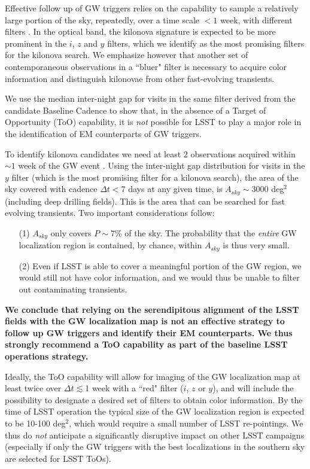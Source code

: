 Effective follow up of GW triggers relies on the capability to sample a
relatively large portion of the sky, repeatedly, over a time scale $<1$
week, with different filters \citep{Cowperthwaite15}. In the optical
band, the kilonova signature is expected to be more prominent in the
$i$, $z$  and $y$ filters, which we identify as the most promising
filters for the kilonova search. We emphasize however that another set
of contemporaneous observations in  a ``bluer" filter is necessary to
acquire color information and distinguish kilonovae from other
fast-evolving transients.

We use the median inter-night gap  for visits in the same filter derived
from the candidate Baseline Cadence  to show that,
in the absence of a Target of Opportunity (ToO) capability, it is
\emph{not} possible for LSST  to play a major role in the identification
of EM counterparts of GW triggers.

To identify kilonova candidates we need at least 2 observations acquired
within $\sim 1$ week  of the GW event \citep{Cowperthwaite15}. Using the
inter-night gap distribution for visits in the $y$ filter (which is the
most promising filter for a kilonova search), the area of the sky
covered with cadence  $\Delta t<7$ days at any given time, is
$A_{sky}\sim 3000$ deg$^2$ (including deep drilling fields).  This is
the area that can be searched for fast evolving transients.  Two
important considerations follow:

\begin{itemize}
\item[(1)] $A_{sky}$ only covers $P\sim7$\% of the sky. The  probability
that the \emph{entire} GW localization region is contained, by chance,
within $A_{sky}$ is thus very small.
\item[(2)] Even if LSST is able to cover a meaningful portion of the GW
region, we would still not have color information, and we would thus be
unable to filter out contaminating transients.
\end{itemize}

\textbf{We conclude that relying on the serendipitous alignment of the
LSST fields with the GW localization map is not an effective strategy to
follow up GW triggers and identify their EM counterparts. We thus
strongly recommend a ToO capability as part of the baseline LSST
operations strategy.}

Ideally, the ToO capability will allow for imaging of the GW
localization map at least twice over $\Delta t\lesssim$1 week with a
``red" filter ($i$, $z$  or $y$),  and  will include the possibility to
designate a desired set of filters to obtain color information. By the
time of LSST operation the typical size of the GW localization region is
expected to be 10-100 deg$^2$, which would require a small number of
LSST re-pointings. We thus do \emph{not} anticipate a significantly
disruptive impact on other LSST campaigns (especially if only the GW
triggers with the best localizations in the southern sky are selected
for LSST ToOs).

